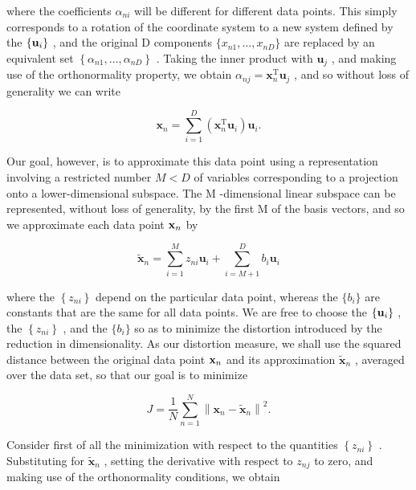 \documentclass[
  10
]{article}
\begin{document}
where the coefficients \(\alpha _ { n i }\) will be different for
different data points. This simply corresponds to a rotation of the
coordinate system to a new system defined by the
\(\left\{ { \bf { u } } _ { i } \right\}\) , and the original D
components \(\{ x _ { n 1 } , \ldots , x _ { n D } \}\) are replaced by
an equivalent set
\(\left\{ \alpha _ { n 1 } , \ldots , \alpha _ { n D } \right\}\) .
Taking the inner product with \(\mathbf { u } _ { j }\) , and making use
of the orthonormality property, we obtain
\(\alpha _ { n j } = \mathbf { x } _ { n } ^ { \mathrm { T } } \mathbf { u } _ { j }\)
, and so without loss of generality we can write

\[
\mathbf {x} _ {n} = \sum_ {i = 1} ^ {D} \left(\mathbf {x} _ {n} ^ {\mathrm{T}} \mathbf {u} _ {i}\right) \mathbf {u} _ {i}.\tag{12.9}
\]

Our goal, however, is to approximate this data point using a
representation involving a restricted number \(M < D\) of variables
corresponding to a projection onto a lower-dimensional subspace. The M
-dimensional linear subspace can be represented, without loss of
generality, by the first M of the basis vectors, and so we approximate
each data point \({ \bf x } _ { n }\) by

\[
\widetilde {\mathbf {x}} _ {n} = \sum_ {i = 1} ^ {M} z _ {n i} \mathbf {u} _ {i} + \sum_ {i = M + 1} ^ {D} b _ {i} \mathbf {u} _ {i}\tag{12.10}
\]

where the \(\left\{ z _ { n i } \right\}\) depend on the particular data
point, whereas the \(\{ b _ { i } \}\) are constants that are the same
for all data points. We are free to choose the
\(\left\{ { \bf { u } } _ { i } \right\}\) , the
\(\left\{ z _ { n i } \right\}\) , and the \(\{ b _ { i } \}\) so as to
minimize the distortion introduced by the reduction in dimensionality.
As our distortion measure, we shall use the squared distance between the
original data point \({ \bf x } _ { n }\) and its approximation
\(\widetilde { \mathbf { x } } _ { n }\) , averaged over the data set,
so that our goal is to minimize

\[
J = \frac {1}{N} \sum_ {n = 1} ^ {N} \left\| \mathbf {x} _ {n} - \widetilde {\mathbf {x}} _ {n} \right\| ^ {2}.\tag{12.11}
\]

Consider first of all the minimization with respect to the quantities
\(\left\{ z _ { n i } \right\}\) . Substituting for
\(\widetilde { \mathbf { x } } _ { n }\) , setting the derivative with
respect to \(z _ { n j }\) to zero, and making use of the orthonormality
conditions, we obtain
\end{document}
